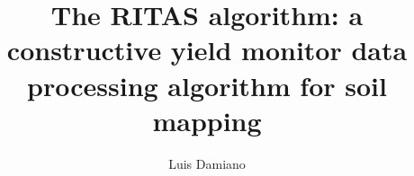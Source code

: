 
\@makechapterheada\titlepage  %
\title{The RITAS algorithm: a constructive yield monitor data
  processing algorithm for soil mapping}

\author{Luis Damiano}








